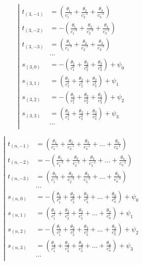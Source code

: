 \begin{equation*} \left| \begin{aligned}
t_{(3,-1)} &=
  \left(
  \frac{\theta_1}{c_1^{-1}}
+ \frac{\theta_2}{c_2^{-1}}
+ \frac{\theta_3}{c_3^{-1}} \right) \\
%
t_{(3,-2)} &=
- \left(
  \frac{\theta_1}{c_1^{-2}}
+ \frac{\theta_2}{c_2^{-2}}
+ \frac{\theta_3}{c_3^{-2}} \right) \\
%
t_{(3,-3)} &=
  \left(
  \frac{\theta_1}{c_1^{-3}}
+ \frac{\theta_2}{c_2^{-3}}
+ \frac{\theta_3}{c_3^{-3}} \right) \\
%
&\ldots \\
%
s_{(3,0)} &=
- \left(
  \frac{\theta_1}{c_1^0}
+ \frac{\theta_2}{c_2^0}
+ \frac{\theta_3}{c_3^0} \right)
+ \psi_0 \\
%
s_{(3,1)} &=
  \left(
  \frac{\theta_1}{c_1^1}
+ \frac{\theta_2}{c_2^1}
+ \frac{\theta_3}{c_3^1} \right)
+ \psi_1 \\
%
s_{(3,2)} &=
- \left(
  \frac{\theta_1}{c_1^2}
+ \frac{\theta_2}{c_2^2}
+ \frac{\theta_3}{c_3^2} \right)
+ \psi_2 \\
%
s_{(3,3)} &=
  \left(
  \frac{\theta_1}{c_1^3}
+ \frac{\theta_2}{c_2^3}
+ \frac{\theta_3}{c_3^3} \right)
+ \psi_3 \\
%
&\ldots \\
\end{aligned} \right. \end{equation*}

\begin{equation*} \left| \begin{aligned}
t_{(n,-1)} &=
  \left(
  \frac{\theta_1}{c_1^{-1}}
+ \frac{\theta_2}{c_2^{-1}}
+ \frac{\theta_3}{c_3^{-1}}
+ \ldots
+ \frac{\theta_n}{c_n^{-1}} \right) \\
%
t_{(n,-2)} &=
- \left(
  \frac{\theta_1}{c_1^{-2}}
+ \frac{\theta_2}{c_2^{-2}}
+ \frac{\theta_3}{c_3^{-2}}
+ \ldots
+ \frac{\theta_n}{c_n^{-2}} \right) \\
%
t_{(n,-3)} &=
  \left(
  \frac{\theta_1}{c_1^{-3}}
+ \frac{\theta_2}{c_2^{-3}}
+ \frac{\theta_3}{c_3^{-3}}
+ \ldots
+ \frac{\theta_n}{c_n^{-3}} \right) \\
%
&\ldots \\
%
s_{(n,0)} &=
- \left(
  \frac{\theta_1}{c_1^0}
+ \frac{\theta_2}{c_2^0}
+ \frac{\theta_3}{c_3^0}
+ \ldots
+ \frac{\theta_n}{c_n^0} \right)
+ \psi_0 \\
%
s_{(n,1)} &=
  \left(
  \frac{\theta_1}{c_1^1}
+ \frac{\theta_2}{c_2^1}
+ \frac{\theta_3}{c_3^1}
+ \ldots
+ \frac{\theta_n}{c_n^1} \right)
+ \psi_1 \\
%
s_{(n,2)} &=
- \left(
  \frac{\theta_1}{c_1^2}
+ \frac{\theta_2}{c_2^2}
+ \frac{\theta_3}{c_3^2}
+ \ldots
+ \frac{\theta_n}{c_n^2} \right)
+ \psi_2 \\
%
s_{(n,3)} &=
  \left(
  \frac{\theta_1}{c_1^3}
+ \frac{\theta_2}{c_2^3}
+ \frac{\theta_3}{c_3^3}
+ \ldots
+ \frac{\theta_n}{c_n^3} \right)
+ \psi_3 \\
%
&\ldots \\
\end{aligned} \right. \end{equation*}
